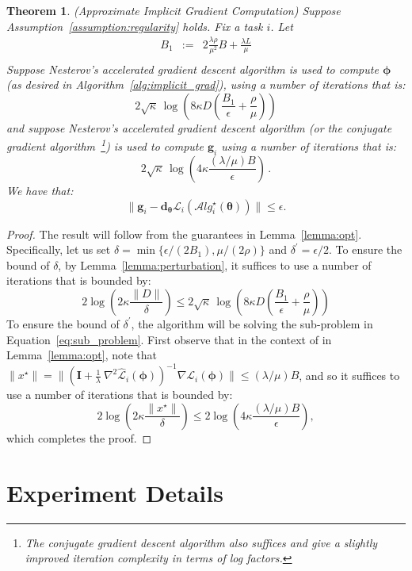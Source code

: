 \documentclass{article} \usepackage[nonatbib, final]{mod_neurips}
\newcommand{\eye}{\boldsymbol{I}}
\newtheorem{theorem}{Theorem}
\newcommand{\param}{{\bm{\phi}}}               \newcommand{\paramspace}{\Phi}
\newcommand{\prior}{{\bm{\theta}}}               \newcommand{\priorspace}{\Theta}
\newcommand{\fn}{\mathcal{L}}                  \newcommand{\udfn}{\tilde{\fn}}        \newcommand{\fnht}{\hat{\fn}}        \newcommand{\ud}{\alg}
\newcommand{\algstar}{\mathcal{A}lg^\star}
\newcommand{\eps}{\epsilon}
\newcommand{\grad}{\bm{d}}
\newcommand{\pgrad}{\nabla}
\begin{document}
\begin{theorem}
(Approximate Implicit Gradient Computation)  Suppose
Assumption~\ref{assumption:regularity} holds. Fix a task $i$.   Let
  \begin{eqnarray*}
B_1& :=& 2 \frac{\lambda\rho}{\mu^2} B+ \frac{\lambda L}{\mu}\\
\end{eqnarray*}
Suppose Nesterov's accelerated gradient descent algorithm is used
to compute $\param$ (as desired in Algorithm~\ref{alg:implicit_grad}), using 
a number of iterations that is:
\[
2\sqrt{\kappa} \, \log\left( 8\kappa D\left(\frac{ B_1}{\eps}+\frac{\rho}{\mu}\right)\right) 
\]
and suppose Nesterov's accelerated gradient descent
algorithm (or the conjugate gradient algorithm~\footnote{The conjugate gradient descent algorithm also
  suffices and give a slightly improved iteration complexity in terms
  of log factors.}) is used to compute $\bm{g}_i$ using
a number of iterations that is:
\[
2\sqrt{\kappa} \, \log\left( 4\kappa \frac{ (\lambda / \mu)B}{\eps}\right) \, .
\]
We have that:
\[
\|\bm{g}_i - \grad_\prior \fn_i(\algstar_i(\prior)) \| \leq 
\eps.
\]
\end{theorem}

\begin{proof}
  The result will follow from the guarantees in
  Lemma~\ref{lemma:opt}. Specifically, let us set
  $\delta=\min\{\eps/(2B_1), \mu/(2\rho) \}$ and
  $\delta^\prime=\eps/2$. To ensure the bound of $\delta$, by
  Lemma~\ref{lemma:perturbation}, it suffices to use a number of
  iterations that is bounded by:
  \[
2\log\left( 2\kappa \frac{ \|D\| }{\delta}\right) \leq
2\sqrt{\kappa} \, \log\left( 8\kappa D\left(\frac{ B_1}{\eps}+\frac{\rho}{\mu}\right)\right) 
  \]
To ensure the bound of $\delta^\prime$, the algorithm will be solving
the sub-problem in Equation~\ref{eq:sub_problem}. First observe that in the
  context of in Lemma~\ref{lemma:opt}, note that
  $\|x^\star\|=\|\left( \eye + \frac{1}{\lambda}~ \pgrad^2 \fnht_i
    (\param) \right)^{-1}\pgrad
  \fn_i(\param)\| \leq (\lambda / \mu)B$, and so
it suffices to use a number of iterations that is bounded by:  
\[
2\log\left( 2\kappa \frac{ \|x^\star\| }{\delta}\right) \leq
2\log\left( 4\kappa \frac{ (\lambda / \mu)B }{\eps}\right) ,
\]
which completes the proof.
\end{proof}

 



\section{Experiment Details}
\label{app:experiments}
\end{document}
